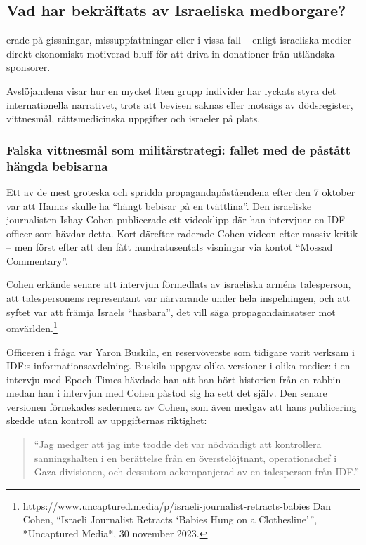 \subsection{Vad har bekräftats av Israeliska medborgare?}
erade på gissningar, missuppfattningar eller i vissa fall – enligt israeliska medier – direkt ekonomiskt motiverad bluff för att driva in donationer från utländska sponsorer.

Avslöjandena visar hur en mycket liten grupp individer har lyckats styra det internationella narrativet, trots att bevisen saknas eller motsägs av dödsregister, vittnesmål, rättsmedicinska uppgifter och israeler på plats.

\subsubsection*{Falska vittnesmål som militärstrategi: fallet med de påstått hängda bebisarna}

Ett av de mest groteska och spridda propagandapåståendena efter den 7 oktober var att Hamas skulle ha “hängt bebisar på en tvättlina”. Den israeliske journalisten Ishay Cohen publicerade ett videoklipp där han intervjuar en IDF-officer som hävdar detta. Kort därefter raderade Cohen videon efter massiv kritik – men först efter att den fått hundratusentals visningar via kontot “Mossad Commentary”.

Cohen erkände senare att intervjun förmedlats av israeliska arméns talesperson, att talespersonens representant var närvarande under hela inspelningen, och att syftet var att främja Israels “hasbara”, det vill säga propagandainsatser mot omvärlden.\footnote{\url{https://www.uncaptured.media/p/israeli-journalist-retracts-babies} Dan Cohen, “Israeli Journalist Retracts ‘Babies Hung on a Clothesline’”, *Uncaptured Media*, 30 november 2023.}

Officeren i fråga var Yaron Buskila, en reservöverste som tidigare varit verksam i IDF:s informationsavdelning. Buskila uppgav olika versioner i olika medier: i en intervju med Epoch Times hävdade han att han hört historien från en rabbin – medan han i intervjun med Cohen påstod sig ha sett det själv. Den senare versionen förnekades sedermera av Cohen, som även medgav att hans publicering skedde utan kontroll av uppgifternas riktighet: 

\begin{quote}
    “Jag medger att jag inte trodde det var nödvändigt att kontrollera sanningshalten i en berättelse från en överstelöjtnant, operationschef i Gaza-divisionen, och dessutom ackompanjerad av en talesperson från IDF.”
\end{quote}

